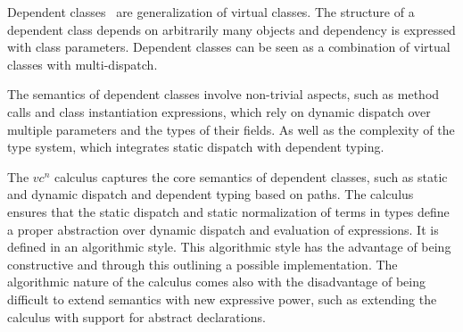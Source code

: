 Dependent classes~\cite{dc,vaidas:thesis} are generalization of virtual classes.
The structure of a dependent class depends on arbitrarily many objects and
dependency is expressed with class parameters.
Dependent classes can be seen as a combination of virtual classes with multi-dispatch.

The semantics of dependent classes involve non-trivial aspects,
such as method calls and class instantiation expressions,
which rely on dynamic dispatch over multiple parameters and the types of their fields.
As well as the complexity of the type system,
which integrates static dispatch with dependent typing.

The $vc^n$ calculus captures the core semantics of dependent classes,
such as static and dynamic dispatch and dependent typing based on paths.
The calculus ensures that the static dispatch and static normalization of terms in types
define a proper abstraction over dynamic dispatch and evaluation of expressions.
It is defined in an algorithmic style.
This algorithmic style has the advantage of being constructive
and through this outlining a possible implementation.
The algorithmic nature of the calculus comes also with the disadvantage
of being difficult to extend semantics with new expressive power,
such as extending the calculus with support for abstract declarations.



